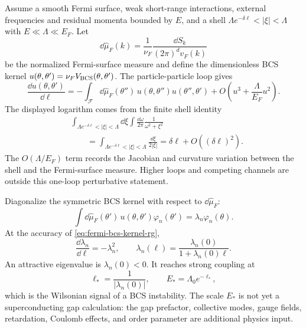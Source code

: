 \begin{controlledapproximation}
\label{ca:cooper-shell-remainder}
Assume a smooth Fermi surface, weak short-range interactions, external
frequencies and residual momenta bounded by \(E\), and a shell
\(\Lambda e^{-\delta\ell}<|\xi|<\Lambda\) with
\(E\ll\Lambda\ll E_F\).  Let
\[
  \dd\widehat\mu_F(k)
  =
  \frac{1}{\nu_F}
  \frac{\dd S_k}{(2\pi)^d v_F(k)}
\]
be the normalized Fermi-surface measure and define the dimensionless BCS kernel
\(u(\theta,\theta')=\nu_F V_{\rm BCS}(\theta,\theta')\).  The particle-particle
loop gives
\begin{equation}
  \frac{\dd u(\theta,\theta')}{\dd\ell}
  =
  -\int_{\mathcal F}\dd\widehat\mu_F(\theta'')\,
  u(\theta,\theta'')u(\theta'',\theta')
  +
  O\!\left(u^3+\frac{\Lambda}{E_F}u^2\right).
  \label{eq:fermi-bcs-kernel-rg}
\end{equation}
The displayed logarithm comes from the finite shell identity
\begin{equation}
\begin{aligned}
  &\int_{\Lambda e^{-\delta\ell}<|\xi|<\Lambda}\dd\xi
  \int\frac{\dd\omega}{2\pi}
  \frac{1}{\omega^2+\xi^2}                                      \\
  &\qquad =
  \int_{\Lambda e^{-\delta\ell}<|\xi|<\Lambda}
  \frac{\dd\xi}{2|\xi|}
  =
  \delta\ell+O((\delta\ell)^2).
\end{aligned}
  \label{eq:fermi-cooper-shell-log}
\end{equation}
The \(O(\Lambda/E_F)\) term records the Jacobian and curvature variation
between the shell and the Fermi-surface measure.  Higher loops and competing
channels are outside this one-loop perturbative statement.
\end{controlledapproximation}

Diagonalize the symmetric BCS kernel with respect to
\(\dd\widehat\mu_F\):
\[
  \int\dd\widehat\mu_F(\theta')\,
  u(\theta,\theta')\varphi_n(\theta')
  =
  \lambda_n\varphi_n(\theta).
\]
At the accuracy of \eqref{eq:fermi-bcs-kernel-rg},
\begin{equation}
  \frac{\dd\lambda_n}{\dd\ell}=-\lambda_n^2,
  \qquad
  \lambda_n(\ell)=\frac{\lambda_n(0)}{1+\lambda_n(0)\ell}.
  \label{eq:fermi-bcs-eigenvalue-flow}
\end{equation}
An attractive eigenvalue is \(\lambda_n(0)<0\).  It reaches strong coupling at
\begin{equation}
  \ell_*=\frac{1}{|\lambda_n(0)|},
  \qquad
  E_*=\Lambda_0 e^{-\ell_*},
  \label{eq:fermi-bcs-instability-scale}
\end{equation}
which is the Wilsonian signal of a BCS instability.  The scale
\(E_*\) is not yet a superconducting gap calculation: the gap prefactor,
collective modes, gauge fields, retardation, Coulomb effects, and order
parameter are additional physics input.

